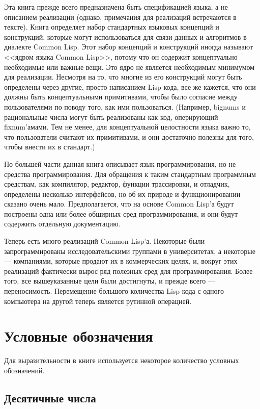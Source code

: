 Эта книга прежде всего предназначена быть спецификацией языка, а не
описанием реализации (однако, примечания для реализаций встречаются в тексте).
Книга определяет набор стандартных языковых концепций и конструкций, которые
могут использоваться для связи данных и алгоритмов в диалекте Common Lisp. Этот
набор концепций и конструкций иногда называют <<ядром языка Common Lisp>>,
потому что он содержит концептуально необходимые или важные вещи.  
Это ядро не является необходимым  минимумом для реализации. Несмотря на то, что
многие из его конструкций могут быть определены через другие, просто написанием
Lisp кода, все же кажется, что они должны быть концептуальными примитивами,
чтобы было согласие между пользователями по поводу 
того, как ими пользоваться. (Например, bignums и рациональные числа могут быть
реализованы как код, оперирующий fixnum'амами. Тем 
не менее, для концептуальной целостности языка важно то, что пользователи
считают их примитивами, и они достаточно полезны для того, чтобы внести их в
стандарт.)

По большей части данная книга описывает язык программирования, но не средства
программирования. Для обращения к таким
стандартным программным средствам, как компилятор, редактор, функции
трассировки, и отладчик, определены несколько интерфейсов, но об их природе и
функционировании сказано очень мало. Предполагается, что на основе Common Lisp'а
будут построены одна или более обширных сред программирования, и они будут
содержить отдельную документацию. 

Теперь есть много реализаций Common Lisp'а. Некоторые были запрограммированы
исследовательскими группами в университетах, а некоторые --- компаниями, которые
продают их в коммерческих целях, и, вокруг
этих реализаций фактически вырос ряд полезных сред для программирования.
Более того, все вышеуказанные цели были достигнуты, и прежде всего ---
переносимость. Перемещение большого количества Lisp-кода с одного компьютера на
другой теперь является рутинной операцией.

\section{Условные обозначения}

Для выразительности в книге используется некоторое количество условных обозначений.

\subsection{Десятичные числа}

